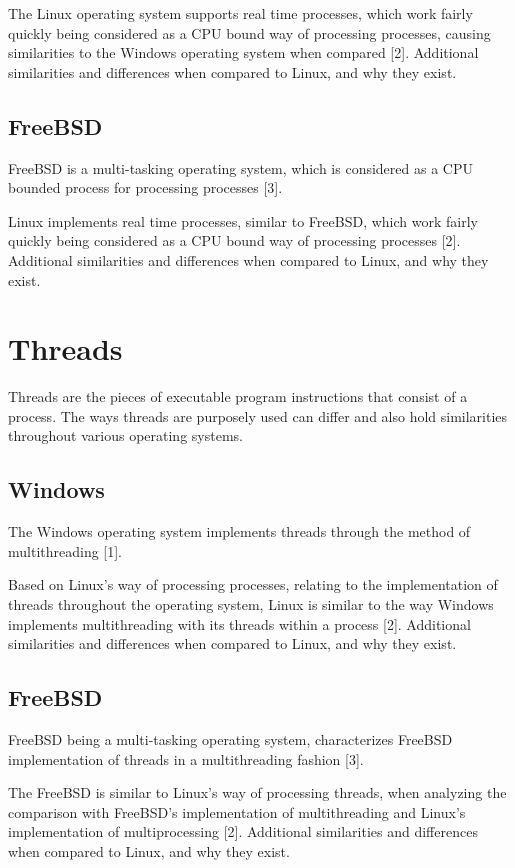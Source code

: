 \documentclass[letterpaper,10pt,onecolumn]{report}
\begin{document}
	\par \noindent
	The Linux operating system supports real time processes, which work fairly quickly being considered as a CPU bound way of processing processes, causing similarities to the Windows operating system when compared [2].
	Additional similarities and differences when compared to Linux, and why they exist.

	\subsection*{FreeBSD}
	FreeBSD is a multi-tasking operating system, which is considered as a CPU bounded process for processing processes [3].
	
	\par \noindent
	Linux implements real time processes, similar to FreeBSD, which work fairly quickly being considered as a CPU bound way of processing processes [2].
	Additional similarities and differences when compared to Linux, and why they exist.

\section*{Threads}
Threads are the pieces of executable program instructions that consist of a process. 
The ways threads are purposely used can differ and also hold similarities throughout various operating systems.

	\subsection*{Windows}
	The Windows operating system implements threads through the method of multithreading [1].
	
	\par \noindent
	Based on Linux's way of processing processes, relating to the implementation of threads throughout the operating system, Linux is similar to the way Windows implements multithreading with its threads within a process [2].
	Additional similarities and differences when compared to Linux, and why they exist.
	

	\subsection*{FreeBSD}
	FreeBSD being a multi-tasking operating system, characterizes FreeBSD implementation of threads	in a multithreading fashion [3].
	
	\par \noindent
	The FreeBSD is similar to Linux's way of processing threads, when analyzing the comparison with FreeBSD's implementation of multithreading and Linux's implementation of multiprocessing [2].
	Additional similarities and differences when compared to Linux, and why they exist.
	
\end{document}
